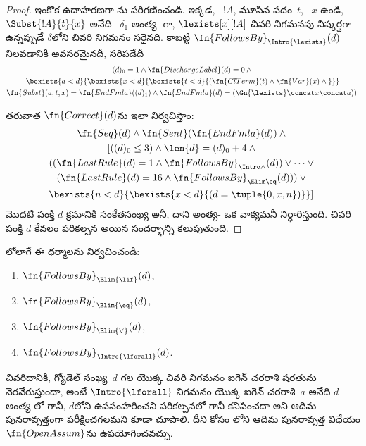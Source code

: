 \documentclass[../../../include/open-logic-section]{subfiles}
\begin{document}
\begin{proof}
  ఇంకొక ఉదాహరణగా \Intro{\lexists}ను పరిగణించండి. ఇక్కడ,
  ~$!A$, మూసిన పదం~$t$,
  ~$x$ ఉండి, $\Subst{!A}{t}{x}$ అనేది
  ~$\delta_1$ అంత్య-
  గా, $\lexists[x][!A]$ చివరి నిగమనపు
  నిష్కర్షగా ఉన్నప్పుడే $\delta$లోని చివరి నిగమనం సరైనది. కాబట్టి
  $\fn{FollowsBy}_{\Intro{\lexists}}(d)$ నిలవడానికి అవసరమైనదీ, సరిపడేదీ
  \begin{multline*}
    (d)_0=1\land\fn{DischargeLabel}(d)=0\land{}\\
    \bexists{a<d}{\bexists{x<d}{\bexists{t<d}{
          (\fn{ClTerm}(t)\land\fn{Var}(x)\land{}}}}\\
    \fn{Subst}(a,t,x)=\fn{EndFmla}((d)_1)\land
    \fn{EndFmla}(d)=(\Gn{\lexists}\concat x\concat a)).
  \end{multline*}

  తరువాత $\fn{Correct}(d)$ను ఇలా నిర్వచిస్తాం:
  \begin{multline*}
    \fn{Seq}(d)\land\fn{Sent}(\fn{EndFmla}(d))\land{}\\
    [((d)_0\leq 3)\land\len{d}=(d)_0+4\land{}\\
    ((\fn{LastRule}(d)=1\land\fn{FollowsBy}_{\Intro\land}(d))
    \lor\dots\lor{}\\
    (\fn{LastRule}(d)=16\land\fn{FollowsBy}_{\Elim\eq}(d)))\lor{}\\
    \bexists{n<d}{\bexists{x<d}{(d=\tuple{0,x,n})}}].
  \end{multline*}
  మొదటి పంక్తి $d$ క్రమానికి సంకేతసంఖ్య అనీ, దాని
  అంత్య- ఒక వాక్యమనీ నిర్ధారిస్తుంది. చివరి పంక్తి $d$ కేవలం పరికల్పన అయిన సందర్భాన్ని కలుపుతుంది.
\end{proof}

\begin{prob}
  లోలాగే ఈ ధర్మాలను నిర్వచించండి:
  \begin{enumerate}
  \item $\fn{FollowsBy}_{\Elim{\lif}}(d)$,
  \item $\fn{FollowsBy}_{\Elim{\eq}}(d)$,
  \item $\fn{FollowsBy}_{\Elim{\lor}}(d)$,
  \item $\fn{FollowsBy}_{\Intro{\lforall}}(d)$.
  \end{enumerate}
  చివరిదానికి, గ్యోడెల్ సంఖ్య~$d$ గల
   యొక్క చివరి నిగమనం ఐగెన్ చరరాశి
  షరతును నెరవేరుస్తుందా, అంటే $\Intro{\lforall}$ నిగమనం యొక్క ఐగెన్
  చరరాశి~$a$ అనేది $d$ అంత్య-లో గానీ,
$d$లోని ఉపసంహరించని పరికల్పనలో గానీ కనిపించదా అని ఆదిమ పునరావృత్తంగా
  పరీక్షించగలమని కూడా చూపాలి. దీని కోసం
  లోని ఆదిమ పునరావృత్త విధేయం
  $\fn{OpenAssum}$ను ఉపయోగించవచ్చు.
\end{prob}
\end{document}
